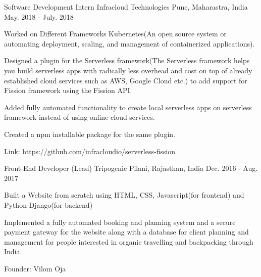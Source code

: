 

\begin{cventries}

  \cventry
    {Software Development Intern} %
    {Infracloud Technologies} %
    {Pune, Maharastra, India} %
    {May. 2018 - July. 2018} %
    {
      \begin{cvitems} %
        \item {Worked on Different Frameworks Kubernetes(An open source system or automating deployment, scaling, and management of containerized applications).}
        \item {Designed a plugin for the Serverless framework(The Serverless framework helps you build serverless apps with radically less overhead and cost on top of already established cloud services such as AWS, Google Cloud etc.) to add support for Fission framework using the Fission API.}
        \item {Added fully automated functionality to create local serverless apps on serverless framework instead of using online cloud services.}
        \item {Created a npm installable package for the same plugin.}
        \item {Link: https://github.com/infracloudio/serverless-fission}
      \end{cvitems}
    }

  \cventry
    {Front-End Developer (Lead)} %
    {Tripogenic } %
    {Pilani, Rajasthan, India} %
    {Dec. 2016 - Aug. 2017} %
    {
      \begin{cvitems} %
        \item {Built a Website from scratch using HTML, CSS, Javascript(for frontend) and Python-Django(for backend)}
        \item {Implemented a fully automated booking and planning system and a secure payment gateway for the website along with a database for client planning and management for people interested in organic travelling and backpacking through India.}
        \item {Founder: Vilom Oja}
      \end{cvitems}
    }

\end{cventries}
